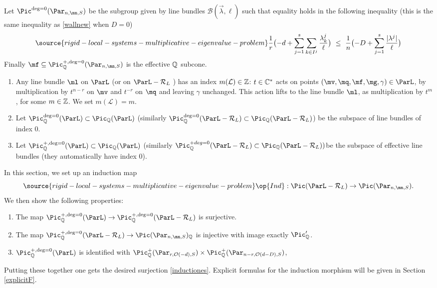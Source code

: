 Let $\Pic^{\deg=0}(\Par_{n,\mn,S})$ be the subgroup given by line bundles $\mathcal{B}(\vec{\lambda},\ell)$ such that  equality holds in the following inequality (this is the same inequality as \eqref{wallnew} when $D=0$)
\begin{equation}\label{wallneww}
\source{rigid-local-systems-multiplicative-eigenvalue-problem}
\frac{1}{r}\bigl(-d+\sum_{j=1}^s\sum_{k\in I^j} \frac{\lambda^j_k}{\ell}\bigr)\ \leq\  \frac{1}{n}\bigl(-D +\sum_{j=1}^s \frac{|\lambda^j|}{\ell}\bigr)
\end{equation}
Finally $\mf\subseteq \Pic^{+,\deg=0}_{\Bbb{Q}}(\Par_{n,\mn,S})$ is the effective $\Bbb{Q}$ subcone.
\begin{defi}
\notready\label{Pin}
\begin{enumerate}
\item Any line bundle $\ml$ on $\ParL$ (or on $\ParL-\mathcal{R}_L$ ) has an index $m(\mathcal{L})\in \Bbb{Z}$: $t\in\Bbb{C}^*$ acts on points $(\mv,\mq,\mf,\mg,\gamma)\in\ParL$, by multiplication
by $t^{n-r}$ on $\mv$ and $t^{-r}$ on $\mq$ and leaving $\gamma$ unchanged. This action lifts to the line bundle $\ml$, as multiplication by $t^m$, for some $m\in\Bbb{Z}$. We set $m(\mathcal{L})=m$.
\item Let $\Pic^{\deg=0}_{\Bbb{Q}}(\ParL)\subset \Pic_{\Bbb{Q}}(\ParL)$ (similarly $\Pic^{\deg=0}_{\Bbb{Q}}(\ParL-\mathcal{R}_L)\subset \Pic_{\Bbb{Q}}(\ParL-\mathcal{R}_L)$) be  the subspace of line bundles of index $0$.
\item Let $\Pic^{+,\deg=0}_{\Bbb{Q}}(\ParL)\subset \Pic_{\Bbb{Q}}(\ParL)$ (similarly $\Pic^{+deg=0}_{\Bbb{Q}}(\ParL-\mathcal{R}_L)\subset \Pic_{\Bbb{Q}}(\ParL-\mathcal{R}_L))$be  the subspace of effective line bundles (they automatically have  index $0$).
\end{enumerate}
\end{defi}
In this section, we set up an induction map
\begin{equation}\label{inducto}
\source{rigid-local-systems-multiplicative-eigenvalue-problem}
\op{Ind}:\Pic(\ParL-\mathcal{R}_L)\to \Pic(\Par_{n,\mn,S}).
\end{equation}
We then show the following properties:
\begin{enumerate}
\item [(I1)] The map $\Pic^{+,\deg=0}_{\Bbb{Q}}(\ParL)\to \Pic^{+,\deg=0}_{\Bbb{Q}}(\ParL-\mathcal{R}_L)$ is surjective.
\item[(I2)] The map $\Pic^{+,\deg=0}_{\Bbb{Q}}(\ParL-\mathcal{R}_L)\to \Pic(\Par_{n,\mn,S})_{\Bbb{Q}}$
is injective with image exactly $\Pic'_{\Bbb{Q}}$.
\item[(I3)]  $\Pic^{+,\deg=0}_{\Bbb{Q}}(\ParL)$ is identified with  $\Pic^+_{\Bbb{Q}}(\Par_{r,\mathcal{O}(-d),S})\times \Pic^+_{\Bbb{Q}}(\Par_{n-r,\mathcal{O}(d-D),S})$,
\end{enumerate}
Putting these together one gets the desired surjection \eqref{inductiones}. Explicit formulas for the induction morphism will be given in Section \ref{explicitF}.

